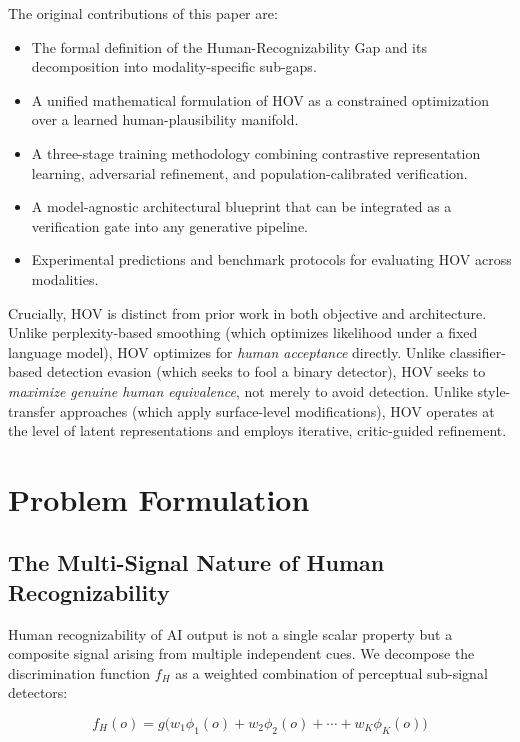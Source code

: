 \documentclass[12pt,oneside]{article}
\begin{document}
The original contributions of this paper are:
\begin{itemize}[noitemsep]
    \item The formal definition of the Human-Recognizability Gap and its decomposition into modality-specific sub-gaps.
    \item A unified mathematical formulation of HOV as a constrained optimization over a learned human-plausibility manifold.
    \item A three-stage training methodology combining contrastive representation learning, adversarial refinement, and population-calibrated verification.
    \item A model-agnostic architectural blueprint that can be integrated as a verification gate into any generative pipeline.
    \item Experimental predictions and benchmark protocols for evaluating HOV across modalities.
\end{itemize}

Crucially, HOV is distinct from prior work in both objective and architecture. Unlike perplexity-based smoothing (which optimizes likelihood under a fixed language model), HOV optimizes for \textit{human acceptance} directly. Unlike classifier-based detection evasion (which seeks to fool a binary detector), HOV seeks to \textit{maximize genuine human equivalence}, not merely to avoid detection. Unlike style-transfer approaches (which apply surface-level modifications), HOV operates at the level of latent representations and employs iterative, critic-guided refinement.

\section{Problem Formulation}

\subsection{The Multi-Signal Nature of Human Recognizability}

Human recognizability of AI output is not a single scalar property but a composite signal arising from multiple independent cues. We decompose the discrimination function $f_H$ as a weighted combination of perceptual sub-signal detectors:

\begin{equation}
f_H(o) = g\Big(w_1 \phi_1(o) + w_2 \phi_2(o) + \cdots + w_K \phi_K(o)\Big)
\end{equation}
\end{document}
